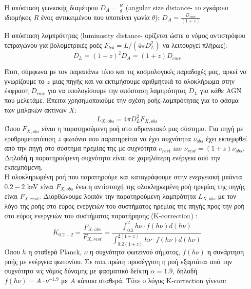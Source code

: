 Η απόσταση γωνιακής διαμέτρου $ D_{A} = \frac{R}{\theta}$ (\textlatin{angular size distance}- το εγκάρσιο ιδιομήκος $R$ ένος αντικειμένου που υποτείνει γωνία $\theta$):
 $D_{A} =  \frac{D_{cmr}}{(1+z)}  $

Η απόσταση λαμπρότητας (\textlatin{luminosity distance}- ορίζεται ώστε ο νόμος αντιστρόφου τετραγώνου για βολομετρικές ροές $F_{bol} = L/(4\pi D_L^2)$ να λειτουργεί πλήρως)\cite{2006PASP..118.1711W}: 
\begin{equation}  D_L = (1+z)^2 D_A = (1+z) D_{cmr} \label{eq:DL}\end{equation}

Έτσι, σύμφωνα με τον παραπάνω τύπο και τις κοσμολογικές παραδοχές μας, αρκεί να γνωρίζουμε το $z$ μιας πηγής και να εκτιμήσουμε αριθμητικά το ολοκλήρωμα στην έκφραση $D_{cmr}$ για να υπολογίσουμε την απόσταση λαμπρότητας $D_L$ για κάθε \textlatin{AGN} που μελετάμε.
Έπειτα χρησημοποιούμε την σχέση ροής-λαμπρότητας για το φάσμα των μαλακών ακτίνων $X$:
\begin{equation}L_{X,obs} = 4\pi D_L^2 F_{X,obs} \label{eq:LumiFluxObs}\end{equation}
Όπου $F_{X,obs}$ είναι η παρατηρούμενη ροή στο αδρανειακό μας σύστημα. Για πηγή με ερυθρομετατόπιση $z$ φωτόνιο που παρατηρείται να έχει συχνότητα $\nu_{obs}$ έχει εκπεμφθεί από την πηγή στο σύστημα ηρεμίας της με συχνότητα $\nu_{rest}$ me $\nu_{rest} = (1+z)\nu_{obs}$. Δηλαδή η παρατηρούμενη συχνότητα είναι σε χαμηλότερη ενέργεια από την εκπεμπόμενη\cite{2002astro.ph.10394H}.\\
Η ολοκληρωμένη ροή που παρατηρούμε και καταγράφουμε στην ενεργειακή μπάντα $0.2-2$ \textlatin{keV} είναι $F_{X,obs}$ ένω η αντίστοιχή της ολοκληρωμένη ροή ηρεμίας της πηγής είναι $F_{X,rest}$.
Διορθώνουμε λοιπόν την παρατηρούμενη λαμπρότητα $L_{X,obs}$ με τον λόγο της ροής στο εύρος ενεργειών του συστήματος ηρεμίας της πηγής προς την ροή στο εύρος ενεργειών του συστήματος παρατήρησης \textlatin{(K-correction)} \cite{1998ApJ...495..100J}: 
\begin{equation}Κ_{0.2-2} =\dfrac{F_{X,obs}}{F_{X,rest}} =\dfrac{\int_{0.2}^{2} h\nu \cdot f(h\nu) d(h\nu)}{\int_{0.2(1+z)}^{2(1+z)}h\nu\cdot f(h\nu) d(h\nu)}\label{eq:K-correction ratio}\end{equation}  
Όπου $h$ η σταθερά \textlatin{Planck}, $\nu$ η συχνότητα φωτεινού σήματος, $f(h\nu)$ η συνάρτηση ροής με ενέργεια φωτονίου. Σε mia πρώτη προσέγγιση η ροή εξαρτάται από την συχνότητα wς νόμος δύναμης με φασματικό δείκτη $\alpha = 1.9$, δηλαδή $f(h\nu) = A \cdot \nu^{-1.9}$ με $Α$ κάποια σταθερά. Τότε ο λόγος \textlatin{K-correction} γίνεται:
